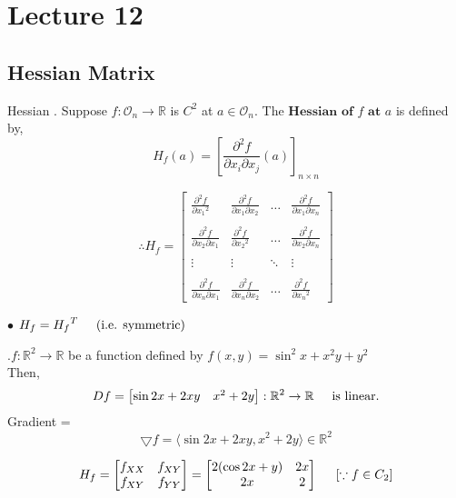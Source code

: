 \documentclass[Analysis-3]{subfiles}
\begin{document}
\chapter*{Lecture 12} %
\setcounter{chapter}{12} %
\setcounter{section}{0}

\section{Hessian Matrix}

\begin{Def}{Hessian}
    . Suppose $f : \mathcal{O}_n \to \mathbb{R}$ is $C^2$ at $a \in \mathcal{O}_n $. The $\textbf{Hessian of $f$ at $a$}$ is defined by, \[ H_f(a) = \left[ \frac{\partial^2 f}{\partial x_i \partial x_j}(a) \right]_{n \times n} \]  
\end{Def}

\[ \therefore H_f = \begin{bmatrix}
    \frac{\partial^2 f}{\partial {x_1}^2} & \frac{\partial^2 f}{\partial x_1 \partial x_2} & \ldots & \frac{\partial^2 f}{\partial x_1 \partial x_n} \\ \\
    \frac{\partial^2 f}{\partial x_2 \partial x_1} & \frac{\partial^2f}{\partial {x_2}^2} & \ldots & \frac{\partial^2f}{\partial x_2 \partial x_n} \\ \\
    \vdots & \vdots & \ddots & \vdots \\ \\
    \frac{\partial^2f}{\partial x_n \partial x_1} & \frac{\partial^2f}{\partial x_n \partial x_2} & \ldots & \frac{\partial^2 f}{\partial {x_n}^2}
\end{bmatrix} \]


$\bullet$ $H_f = {H_f}^T \hspace{5mm} (\text{i.e. symmetric})$ 

\begin{Eg}{}
    .$f : \mathbb{R}^2 \to \mathbb{R}$ be a function defined by $f(x,y) = \sin^2 x + x^2y + y^2$ \\

    Then, \[Df = \begin{bmatrix}
        \sin2x + 2xy & x^2 + 2y 
    \end{bmatrix} :  \mathbb{R}^2 \to \mathbb{R} \hspace{5mm} \text{is linear.} \]
    Gradient = \[\bigtriangledown f = \langle \sin2x + 2xy , x^2 + 2y \rangle \in \mathbb{R}^2 \] 


\[ H_f = \begin{bmatrix}
    f_{XX} & f_{XY} \\
    f_{XY} & f_{YY}
\end{bmatrix} = \begin{bmatrix}
    2( \cos2x + y) & 2x \\
    2x & 2
\end{bmatrix} \hspace{5mm} [ \because  f \in C_2] \]

\end{Eg}
\end{document}
